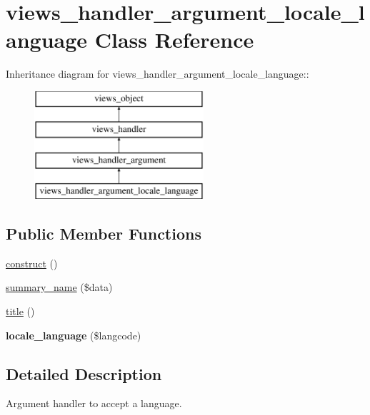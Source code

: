 \hypertarget{classviews__handler__argument__locale__language}{
\section{views\_\-handler\_\-argument\_\-locale\_\-language Class Reference}
\label{classviews__handler__argument__locale__language}
}
Inheritance diagram for views\_\-handler\_\-argument\_\-locale\_\-language::\begin{figure}[H]
\begin{center}
\leavevmode
\includegraphics[height=4cm]{classviews__handler__argument__locale__language}
\end{center}
\end{figure}
\subsection*{Public Member Functions}
\begin{CompactItemize}
\item 
\hyperlink{classviews__handler__argument__locale__language_de5af4ea7ada57c6716a6712bbc767c5}{construct} ()
\item 
\hyperlink{classviews__handler__argument__locale__language_1677e5e59d9e98999bf5781d7de21b39}{summary\_\-name} (\$data)
\item 
\hyperlink{classviews__handler__argument__locale__language_87bfadf6710bcc6bee4f734d258e7407}{title} ()
\item 
\hypertarget{classviews__handler__argument__locale__language_f69fb99da31a079b833d8d2b24a75fd2}{
\textbf{locale\_\-language} (\$langcode)}
\label{classviews__handler__argument__locale__language_f69fb99da31a079b833d8d2b24a75fd2}

\end{CompactItemize}


\subsection{Detailed Description}
Argument handler to accept a language. 

